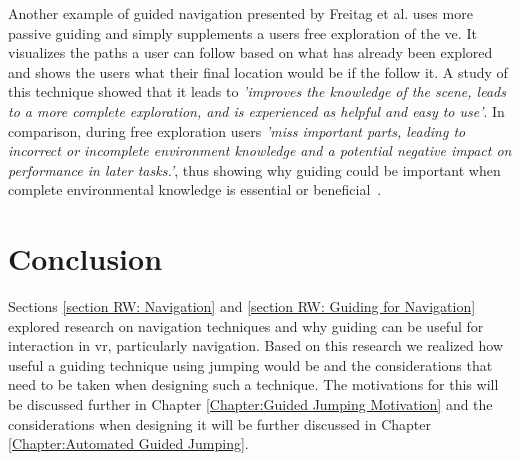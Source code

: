 Another example of guided navigation presented by Freitag et al. uses more passive guiding and simply supplements a users free exploration of the \acrshort{ve}. It visualizes the paths a user can follow based on what has already been explored and shows the users what their final location would be if the follow it. A study of this technique showed that it leads to \textit{'improves the knowledge of the scene, leads to a more complete exploration, and is experienced as helpful and easy to use'}. In comparison, during free exploration users \textit{'miss important parts, leading to incorrect or incomplete environment knowledge and a potential negative impact on performance in later tasks.'}, thus showing why guiding could be important when complete environmental knowledge is essential or beneficial~\cite{Freitag2018}.

\section{Conclusion}
\label{section RW: Conclusion}
Sections \ref{section RW: Navigation} and \ref{section RW: Guiding for Navigation} explored research on navigation techniques and why guiding can be useful for interaction in \acrshort{vr}, particularly navigation. Based on this research we realized how useful a guiding technique using jumping would be and the considerations that need to be taken when designing such a technique. The motivations for this will be discussed further in Chapter \ref{Chapter:Guided Jumping Motivation} and the considerations when designing it will be further discussed in Chapter \ref{Chapter:Automated Guided Jumping}.